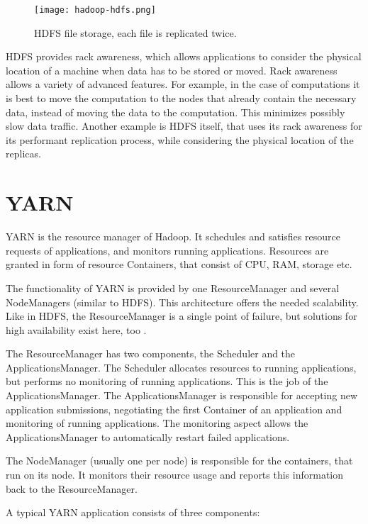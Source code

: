 \begin{figure}[ht!]
  \centering
  \texttt{[image: hadoop-hdfs.png]}
  \caption{HDFS file storage, each file is replicated twice.}
  \label{fig:hadoop-hdfs}
\end{figure}

HDFS provides rack awareness, which allows applications to consider the physical location of a machine when data has to be stored or moved. Rack awareness allows a variety of advanced features. For example, in the case of computations it is best to move the computation to the nodes that already contain the necessary data, instead of moving the data to the computation. This minimizes possibly slow data traffic. Another example is HDFS itself, that uses its rack awareness for its performant replication process, while considering the physical location of the replicas.

\section{YARN}
YARN is the resource manager of Hadoop. It schedules and satisfies resource requests of applications, and monitors running applications. Resources are granted in form of resource Containers, that consist of CPU, RAM, storage etc.

The functionality of YARN is provided by one ResourceManager and several NodeManagers (similar to HDFS). This architecture offers the needed scalability. Like in HDFS, the ResourceManager is a single point of failure, but solutions for high availability exist here, too \cite{yarn-ha}.

The ResourceManager has two components, the Scheduler and the ApplicationsManager. The Scheduler allocates resources to running applications, but performs no monitoring of running applications. This is the job of the ApplicationsManager. The ApplicationsManager is responsible for accepting new application submissions, negotiating the first Container of an application and monitoring of running applications. The monitoring aspect allows the ApplicationsManager to automatically restart failed applications.

The NodeManager (usually one per node) is responsible for the containers, that run on its node. It monitors their resource usage and reports this information back to the ResourceManager.

A typical YARN application consists of three components:

